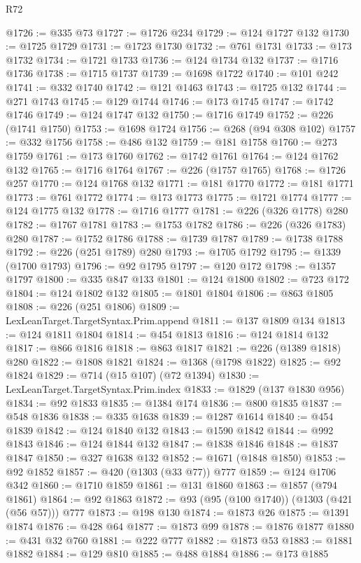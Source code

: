 \begin{lexlean}{R72}
\begin{coremodule}
@1726 := @335 @73
@1727 := @1726 @234
@1729 := @124 @1727 @132
@1730 := @1725 @1729
@1731 := @1723 @1730
@1732 := @761 @1731
@1733 := @173 @1732
@1734 := @1721 @1733
@1736 := @124 @1734 @132
@1737 := @1716 @1736
@1738 := @1715 @1737
@1739 := @1698 @1722
@1740 := @101 @242
@1741 := @332 @1740
@1742 := @121 @1463
@1743 := @1725 @132
@1744 := @271 @1743
@1745 := @129 @1744
@1746 := @173 @1745
@1747 := @1742 @1746
@1749 := @124 @1747 @132
@1750 := @1716 @1749
@1752 := @226 (@1741 @1750)
@1753 := @1698 @1724
@1756 := @268 (@94 @308 @102)
@1757 := @332 @1756
@1758 := @486 @132
@1759 := @181 @1758
@1760 := @273 @1759
@1761 := @173 @1760
@1762 := @1742 @1761
@1764 := @124 @1762 @132
@1765 := @1716 @1764
@1767 := @226 (@1757 @1765)
@1768 := @1726 @257
@1770 := @124 @1768 @132
@1771 := @181 @1770
@1772 := @181 @1771
@1773 := @761 @1772
@1774 := @173 @1773
@1775 := @1721 @1774
@1777 := @124 @1775 @132
@1778 := @1716 @1777
@1781 := @226 (@326 @1778) @280
@1782 := @1767 @1781
@1783 := @1753 @1782
@1786 := @226 (@326 @1783) @280
@1787 := @1752 @1786
@1788 := @1739 @1787
@1789 := @1738 @1788
@1792 := @226 (@251 @1789) @280
@1793 := @1705 @1792
@1795 := @1339 (@1700 @1793)
@1796 := @92 @1795
@1797 := @120 @172
@1798 := @1357 @1797
@1800 := @335 @847 @133
@1801 := @124 @1800
@1802 := @723 @172
@1804 := @124 @1802 @132
@1805 := @1801 @1804
@1806 := @863 @1805
@1808 := @226 (@251 @1806)
@1809 := LexLeanTarget.TargetSyntax.Prim.append
@1811 := @137 @1809 @134
@1813 := @124 @1811 @1804
@1814 := @454 @1813
@1816 := @124 @1814 @132
@1817 := @866 @1816
@1818 := @863 @1817
@1821 := @226 (@1389 @1818) @280
@1822 := @1808 @1821
@1824 := @1368 (@1798 @1822)
@1825 := @92 @1824
@1829 := @714 (@15 @107) (@72 @1394)
@1830 := LexLeanTarget.TargetSyntax.Prim.index
@1833 := @1829 (@137 @1830 @956)
@1834 := @92 @1833
@1835 := @1384 @174
@1836 := @800 @1835
@1837 := @548 @1836
@1838 := @335 @1638
@1839 := @1287 @1614
@1840 := @454 @1839
@1842 := @124 @1840 @132
@1843 := @1590 @1842
@1844 := @992 @1843
@1846 := @124 @1844 @132
@1847 := @1838 @1846
@1848 := @1837 @1847
@1850 := @327 @1638 @132
@1852 := @1671 (@1848 @1850)
@1853 := @92 @1852
@1857 := @420 (@1303 (@33 @77)) @777
@1859 := @124 @1706 @342
@1860 := @1710 @1859
@1861 := @131 @1860
@1863 := @1857 (@794 @1861)
@1864 := @92 @1863
@1872 := @93 (@95 (@100 @1740)) (@1303 (@421 (@56 @57))) @777
@1873 := @198 @130
@1874 := @1873 @26
@1875 := @1391 @1874
@1876 := @428 @64
@1877 := @1873 @99
@1878 := @1876 @1877
@1880 := @431 @32 @760
@1881 := @222 @777
@1882 := @1873 @53
@1883 := @1881 @1882
@1884 := @129 @810
@1885 := @488 @1884
@1886 := @173 @1885

\end{coremodule}
\end{lexlean}
